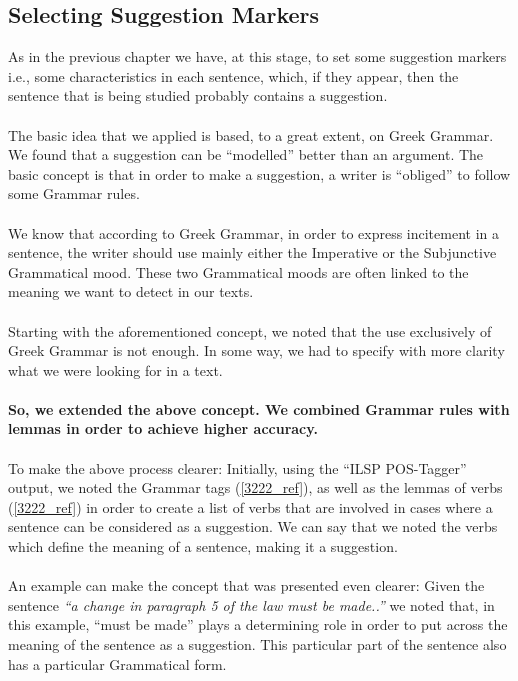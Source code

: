 \subsection{Selecting Suggestion Markers}\label{331_ref}
As in the previous chapter we have, at this stage, to set some suggestion markers i.e., some characteristics in each sentence, which, if they appear, then the sentence that is being studied probably contains a suggestion.\\
\\
The basic idea that we applied is based, to a great extent, on Greek Grammar. We found that a suggestion can be ``modelled'' better than an argument. The basic concept is that in order to make a suggestion, a writer is ``obliged'' to follow some Grammar rules.\\
\\
We know that according to Greek Grammar, in order to express incitement in a sentence, the writer should use mainly either the Imperative or the Subjunctive Grammatical mood. These two Grammatical moods are often linked to the meaning we want to detect in our texts.\\
\\
Starting with the aforementioned concept, we noted that the use exclusively of Greek Grammar is not enough. In some way, we had to specify with more clarity what we were looking for in a text.\\
\\
\textbf{So, we extended the above concept. We combined Grammar rules with lemmas in order to achieve higher accuracy.}\\
\\
To make the above process clearer: Initially, using the ``ILSP POS-Tagger'' output, we noted the Grammar tags (\ref{3222_ref}), as well as the lemmas of verbs (\ref{3222_ref}) in order to create a list of verbs that are involved in cases where a sentence can be considered  as a suggestion. We can say that we noted the verbs which define the meaning of a sentence, making it a suggestion.\\
\\
An example can make the concept that was presented even clearer: Given the sentence \textit{``a change in paragraph 5 of the law  must be made..''} we noted that, in this example, ``must be made'' plays a determining role in order to put across the meaning of the sentence as a suggestion. This particular part of the sentence also has a particular Grammatical form.\\
\newpage
{}
